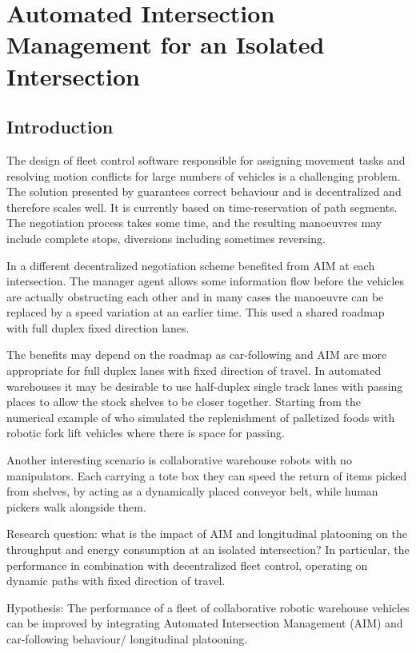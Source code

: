 
\chapter{Automated Intersection Management for an Isolated Intersection}
\section{Introduction}

The design of fleet control software responsible for assigning movement tasks and resolving motion conflicts for large numbers of vehicles is a challenging problem. The solution presented by \cite{Draganjac2020} guarantees correct behaviour and is decentralized and therefore scales well. It is currently based on time-reservation of path segments. The negotiation process takes some time, and the resulting manoeuvres may include complete stops, diversions including sometimes reversing. 

In \cite{Digani2019} a different decentralized negotiation scheme benefited from AIM at each intersection. The manager agent allows some information flow before the vehicles are actually obstructing each other and in many cases the manoeuvre can be replaced by a speed variation at an earlier time. This used a shared roadmap with full duplex fixed direction lanes.

The benefits may depend on the roadmap as car-following and AIM are more appropriate for full duplex lanes with fixed direction of travel. In automated warehouses it may be desirable to use half-duplex single track lanes with passing places to allow the stock shelves to be closer together. Starting from the numerical example of \cite{Draganajac2020} who simulated the replenishment of palletized foods with robotic fork lift vehicles where there is space for passing. 

Another interesting scenario is collaborative warehouse robots with no manipulators. Each carrying a tote box they can speed the return of items picked from shelves, by acting as a dynamically placed conveyor belt, while human pickers walk alongside them.

Research question: what is the impact of AIM and longitudinal platooning on the throughput and energy consumption at an isolated intersection? In particular, the performance in combination with decentralized fleet control, operating on dynamic paths with fixed direction of travel. 

Hypothesis: The performance of a fleet of collaborative robotic warehouse vehicles can be improved by integrating Automated Intersection Management (AIM) and car-following behaviour/ longitudinal platooning.


